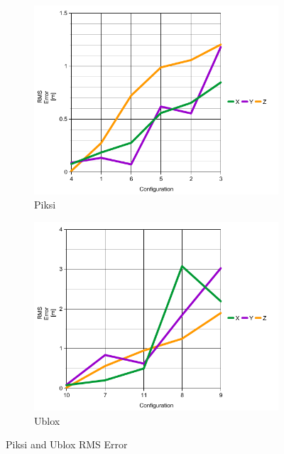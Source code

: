 \documentclass{article}
\begin{document}
\begin{figure}
\centering
\begin{subfigure}{.5\textwidth}
  \centering
  \includegraphics[width=1\linewidth]{images/piksi_rms_error.png}
  \caption{Piksi}
  \label{fig:sub1}
\end{subfigure}%
\begin{subfigure}{.5\textwidth}
  \centering
  \includegraphics[width=1\linewidth]{images/ublox_rms_error.png}
  \caption{Ublox}
  \label{fig:sub2}
\end{subfigure}%
\caption{Piksi and Ublox RMS Error }
\label{rms error}
\end{figure}
\end{document}

